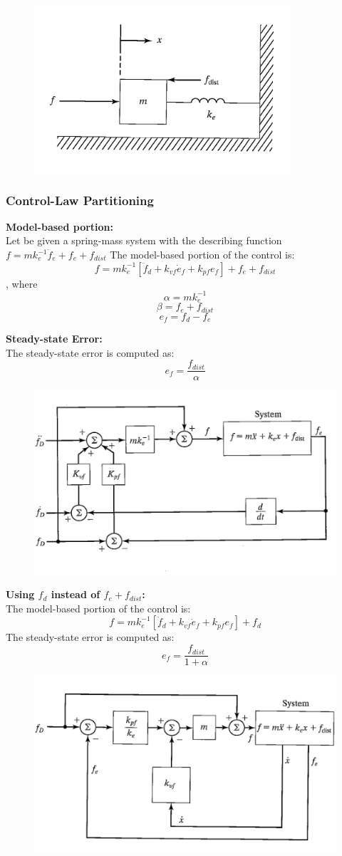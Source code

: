 \documentclass[10pt,a4paper]{article}
\begin{document}
\begin{figure}[H]
	\includegraphics[width=0.5\columnwidth]{imgs/force_control_spring_mass.png}
\end{figure}


\subsubsection{Control-Law Partitioning}
\textbf{Model-based portion:} \\
Let be given a spring-mass system with the describing function $f = mk_e^{-1} \ddot f_e + f_e + f_{dist}$
The model-based portion of the control is:
$$
	f = m k_e^{-1} [\ddot f_d + k_{vf} \dot e_f + k_{pf} e_f] + f_e + f_{dist}
$$
, where
$$
	\alpha = mk_e^{-1}
$$
$$
	\beta = f_e + f_{dist}
$$
$$
	e_f = f_d - f_e
$$

\textbf{Steady-state Error:} \\
The steady-state error is computed as:
$$
	e_f = \frac{f_{dist}}{\alpha}
$$

\begin{figure}[H]
	\includegraphics[width=0.5\columnwidth]{imgs/force_control_f_e.png}
\end{figure}

\textbf{Using $f_d$ instead of $f_e + f_{dist}$:} \\
The model-based portion of the control is:
$$
f = m k_e^{-1} [\ddot f_d + k_{vf} \dot e_f + k_{pf} e_f] + f_d
$$
The steady-state error is computed as:
$$
	e_f = \frac{f_{dist}}{1 + \alpha}
$$

\begin{figure}[H]
	\includegraphics[width=0.5\columnwidth]{imgs/force_control_f_d.png}
\end{figure}
\end{document}
